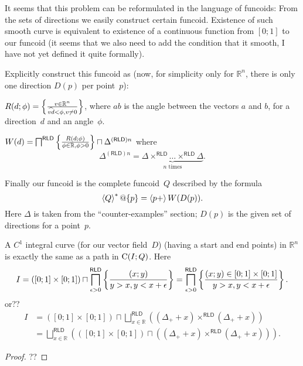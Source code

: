It seems that this problem can be reformulated in the language of funcoids: From the sets of directions we easily construct certain funcoid.
Existence of such smooth curve is equivalent to existence of a continuous function from $[0;1]$ to our funcoid (it seems that we also need to add the
condition that it smooth, I have not yet defined it quite formally).

Explicitly construct this funcoid as (now, for simplicity only for $\mathbb{R}^n$, there is only one direction $D(p)$ per point~$p$):

$R(d;\phi) = \left\{ \frac{v\in\mathbb{R}^n}{\widehat{vd}<\phi, v\ne 0}\right\}$,
where $\widehat{ab}$ is the angle between the vectors $a$ and $b$,
for a direction~$d$ and an angle~$\phi$.

$W(d) = \bigsqcap^{\mathsf{RLD}}\left\{ \frac{R(d;\phi)}{\phi\in\mathbb{R},\phi>0}\right\} \sqcap \Delta^{(\mathsf{RLD})n}$
where \[ \Delta^{(\mathsf{RLD})n} = \underbrace{\Delta\times^{\mathsf{RLD}}\dots\times^{\mathsf{RLD}}\Delta}_{n\text{ times}}. \]

Finally our funcoid is the complete funcoid~$Q$ described by the formula
\[ \left\langle Q\right\rangle ^{\ast}@\{p\} = \left\langle p+\right\rangle W(D(p)). \]
Here $\Delta$ is taken from the ``counter-examples'' section;
$D(p)$ is the given set of directions for a point~$p$.


\begin{thm}
A $C^1$ integral curve (for our vector field~$D$) (having a start and end points) in $\mathbb{R}^n$ is exactly the same as a path in $\mathrm{C}(I;Q)$.
Here \[ I = ([0;1]\times[0;1]) \sqcap \bigsqcap^{\mathsf{RLD}}_{\epsilon>0} \left\{ \frac{(x;y)}{y>x, y<x+\epsilon}\right\} =
\bigsqcap^{\mathsf{RLD}}_{\epsilon>0} \left\{ \frac{(x;y)\in[0;1]\times[0;1]}{y>x, y<x+\epsilon}\right\}
. \]
or??
\begin{align*}
I &= ([0;1]\times[0;1]) \sqcap \bigsqcup^{\mathsf{RLD}}_{x\in\mathbb{R}} ((\Delta_{+}+x)\times^{\mathsf{RLD}}(\Delta_{+}+x)) \\
  &= \bigsqcup^{\mathsf{RLD}}_{x\in\mathbb{R}} (([0;1]\times[0;1])\sqcap((\Delta_{+}+x)\times^{\mathsf{RLD}}(\Delta_{+}+x))) .
\end{align*}
\end{thm}

\begin{proof}
??
\end{proof}

